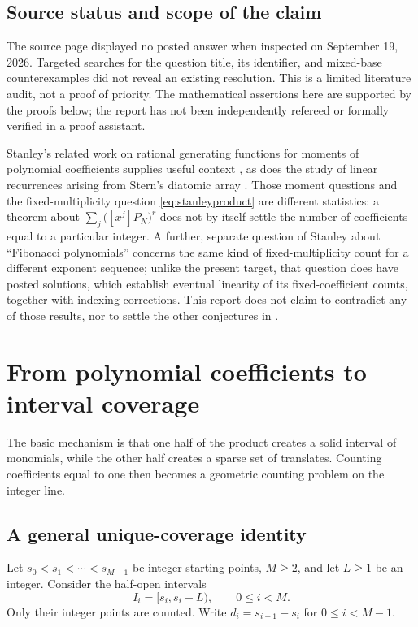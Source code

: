 \documentclass[11pt,letterpaper]{article}
\numberwithin{equation}{section}
\theoremstyle{definition}
\theoremstyle{remark}
\begin{document}
\subsection{Source status and scope of the claim}
The source page displayed no posted answer when inspected on September 19,
2026. Targeted searches for the question title, its identifier, and mixed-base
counterexamples did not reveal an existing resolution. This is a limited
literature audit, not a proof of priority. The mathematical assertions here
are supported by the proofs below; the report has not been independently
refereed or formally verified in a proof assistant.

Stanley's related work on rational generating functions for moments of
polynomial coefficients supplies useful context \cite{StanleyRational},
as does the study of linear recurrences arising from Stern's diatomic
array \cite{StanleyStern}. Those moment questions and the
fixed-multiplicity question \eqref{eq:stanleyproduct} are different
statistics: a theorem about $\sum_j\bigl([x^j]P_N\bigr)^r$ does not by
itself settle the number of coefficients equal to a particular integer.
A further, separate question of Stanley about ``Fibonacci polynomials''
\cite{StanleyFibonacci} concerns the same kind of fixed-multiplicity count
for a different exponent sequence; unlike the present target, that question
does have posted solutions, which establish eventual linearity of its
fixed-coefficient counts, together with indexing corrections. This report
does not claim to contradict any of those results, nor to settle the other
conjectures in \cite{StanleyRational}.

\section{From polynomial coefficients to interval coverage}\label{sec:intervals}

The basic mechanism is that one half of the product creates a solid interval
of monomials, while the other half creates a sparse set of translates.
Counting coefficients equal to one then becomes a geometric counting problem
on the integer line.

\subsection{A general unique-coverage identity}
Let $s_0<s_1<\cdots<s_{M-1}$ be integer starting points, $M\ge2$, and let
$L\ge1$ be an integer. Consider the half-open intervals
\[
 I_i=[s_i,s_i+L),\qquad 0\le i<M.
\]
Only their integer points are counted. Write
$d_i=s_{i+1}-s_i$ for $0\le i<M-1$.
\end{document}
